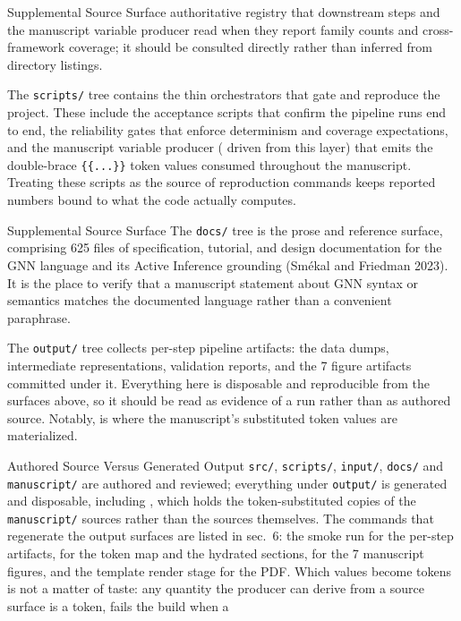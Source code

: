 \documentclass[
  ignorenonframetext,
]{beamer}
\begin{document}
\begin{frame}{Supplemental Source Surface}
authoritative registry that downstream steps and the manuscript variable
producer read when they report family counts and cross-framework
coverage; it should be consulted directly rather than inferred from
directory listings.

The \texttt{scripts/} tree contains the thin orchestrators that gate and
reproduce the project. These include the acceptance scripts that confirm
the pipeline runs end to end, the reliability gates that enforce
determinism and coverage expectations, and the manuscript variable
producer ( driven from this
layer) that emits the double-brace \texttt{\{\{...\}\}} token values
consumed throughout the manuscript. Treating these scripts as the source
of reproduction commands keeps reported numbers bound to what the code
actually computes.

\end{frame}

\begin{frame}{Supplemental Source Surface}
The \texttt{docs/} tree is the prose and reference surface, comprising
625 files of specification, tutorial, and design documentation for the
GNN language and its Active Inference grounding (Smékal and Friedman
2023). It is the place to verify that a manuscript statement about GNN
syntax or semantics matches the documented language rather than a
convenient paraphrase.

The \texttt{output/} tree collects per-step pipeline artifacts: the data
dumps, intermediate representations, validation reports, and the 7
figure artifacts committed under it. Everything here is disposable and
reproducible from the surfaces above, so it should be read as evidence
of a run rather than as authored source. Notably,
 is where the
manuscript's substituted token values are materialized.
\end{frame}

\begin{frame}{Authored Source Versus Generated
Output}
\protect{}\label{authored-source-versus-generated-output}
\texttt{src/}, \texttt{scripts/}, \texttt{input/}, \texttt{docs/} and
\texttt{manuscript/} are authored and reviewed; everything under
\texttt{output/} is generated and disposable, including
, which holds the token-substituted copies of
the \texttt{manuscript/} sources rather than the sources themselves. The
commands that regenerate the output surfaces are listed in
sec.~6: the smoke run for the per-step
artifacts,  for
the token map and the hydrated sections,
 for the 7 manuscript
figures, and the template render stage for the PDF. Which values become
tokens is not a matter of taste: any quantity the producer can derive
from a source surface is a token,
 fails the build when a
\end{frame}
\end{document}
